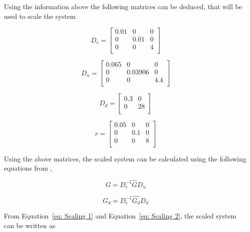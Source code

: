 Using the information above the following matrices can be deduced, that will be used to scale the system

\begin{equation}
	D_e = \begin{bmatrix}
	0.01 & 0 & 0 \\
	0 & 0.01 & 0 \\
	0 & 0 & 4 \\
	\end{bmatrix}
\end{equation}

\begin{equation}
D_u = \begin{bmatrix}
0.065 & 0 & 0 \\
0 & 0.03906 & 0 \\
0 & 0 & 4.4 \\
\end{bmatrix}
\end{equation}

\begin{equation}
D_d = \begin{bmatrix}
0.3 & 0 \\
0 & 28 \\
\end{bmatrix}
\end{equation}

\begin{equation}
r = \begin{bmatrix}
0.05 & 0 & 0 \\
0 & 0.1 & 0 \\
0 & 0 & 8 \\
\end{bmatrix}
\end{equation}

Using the above matrices, the scaled system can be calculated using the following equations from \textcite{skogestad},

\begin{equation}
	\label{eq: Scaling 1}
	G = D_e ^{-1}\hat{G}D_u
\end{equation}

\begin{equation}
	\label{eq: Scaling 2}
	G_d = D_e ^{-1}\hat{G_d}D_d
\end{equation}

From Equation~\ref{eq: Scaling 1} and Equation~\ref{eq: Scaling 2}, the scaled system can be written as 

